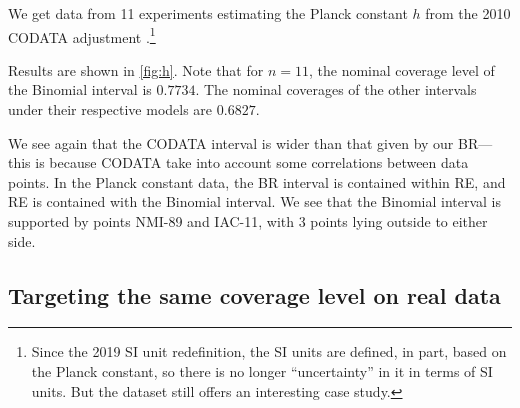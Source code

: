 \documentclass[12pt]{article}
\begin{document}
We get data from 11 experiments estimating the Planck constant $h$ from the 2010 CODATA adjustment \cite[Table 26]{mohr2012codata}.\footnote{Since the 2019 SI unit redefinition, the SI units are defined, in part, based on the Planck constant, so there is no longer ``uncertainty'' in it in terms of SI units. But the dataset still offers an interesting case study.}

Results are shown in \ref{fig:h}. Note that for $n=11$, the nominal coverage level of the Binomial interval is $0.7734$. The nominal coverages of the other intervals under their respective models are $0.6827$.

We see again that the CODATA interval is wider than that given by our BR---this is because CODATA take into account some correlations between data points. In the Planck constant data, the BR interval is contained within RE, and RE is contained with the Binomial interval. We see that the Binomial interval is supported by points NMI-89 and IAC-11, with 3 points lying outside to either side.

\subsection{Targeting the same coverage level on real data}\label{targeting-the-same-coverage-level-on-real-data}
\end{document}
